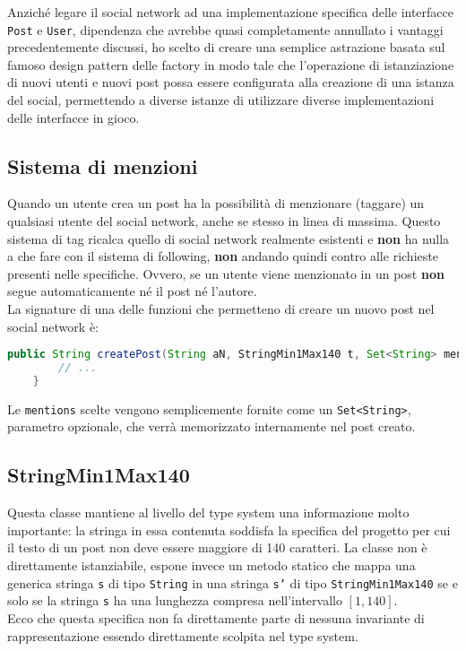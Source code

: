 \documentclass[a4paper,10pt]{book}
\begin{document}
Anziché legare il social network ad una implementazione specifica delle interfacce \texttt{Post} e \texttt{User}, dipendenza che avrebbe quasi completamente annullato
i vantaggi precedentemente discussi, ho scelto di creare una semplice astrazione basata sul famoso design pattern delle factory in modo tale che l'operazione di istanziazione di
nuovi utenti e nuovi post possa essere configurata alla creazione di una istanza del social, permettendo a diverse istanze di utilizzare diverse implementazioni delle interfacce in gioco.


\subsection*{Sistema di menzioni}

Quando un utente crea un post ha la possibilità di menzionare (taggare) un qualsiasi utente del social network, anche se stesso in linea di massima.
Questo sistema di tag ricalca quello di social network realmente esistenti e \textbf{non} ha nulla a che fare con il sistema di following, \textbf{non}
andando quindi contro alle richieste presenti nelle specifiche. Ovvero, se un utente viene menzionato in un post \textbf{non} segue automaticamente né il post né l'autore.\\
La signature di una delle funzioni che permetteno di creare un nuovo post nel social network è:

\begin{lstlisting}[language=java]
    public String createPost(String aN, StringMin1Max140 t, Set<String> mentions) {
        // ...
    }
\end{lstlisting}

\noindent
Le \texttt{mentions} scelte vengono semplicemente fornite come un \texttt{Set<String>}, parametro opzionale, che verrà memorizzato internamente nel post creato.

\subsection*{StringMin1Max140}
Questa classe mantiene al livello del type system una informazione molto importante: la stringa in essa contenuta soddisfa la specifica del progetto per cui il
testo di un post non deve essere maggiore di 140 caratteri. La classe non è direttamente istanziabile, espone invece un metodo statico che mappa una generica stringa \texttt{s} di tipo
\texttt{String} in una stringa \texttt{s'} di tipo \texttt{StringMin1Max140} se e solo se la stringa \texttt{s} ha una lunghezza compresa nell'intervallo $[1, 140]$.\\
Ecco che questa specifica non fa direttamente parte di nessuna invariante di rappresentazione essendo direttamente scolpita nel type system.
\end{document}
